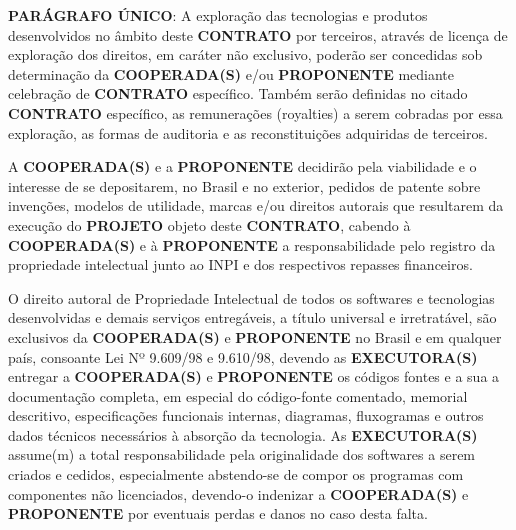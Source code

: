 \leftskip 30pt 
\textbf{PARÁGRAFO ÚNICO}: A exploração das tecnologias e produtos desenvolvidos no âmbito deste \textbf{CONTRATO} por terceiros, através de licença de exploração dos direitos, em caráter não exclusivo, poderão ser concedidas sob determinação da \textbf{COOPERADA(S)} e/ou \textbf{PROPONENTE} mediante celebração de \textbf{CONTRATO} específico. Também serão definidas no citado \textbf{CONTRATO} específico, as remunerações (royalties) a serem cobradas por essa exploração, as formas de auditoria e as reconstituições adquiridas de terceiros.

\xx A \textbf{COOPERADA(S)} e a \textbf{PROPONENTE} decidirão pela viabilidade e o interesse de se depositarem, no Brasil e no exterior, pedidos de patente sobre invenções, modelos de utilidade, marcas e/ou direitos autorais que resultarem da execução do \textbf{PROJETO} objeto deste \textbf{CONTRATO}, cabendo à \textbf{COOPERADA(S)} e à \textbf{PROPONENTE} a responsabilidade pelo registro da propriedade intelectual junto ao INPI e dos respectivos repasses financeiros.

\xx O direito autoral de Propriedade Intelectual de todos os softwares e tecnologias desenvolvidas e demais serviços entregáveis, a título universal e irretratável, são exclusivos da \textbf{COOPERADA(S)} e \textbf{PROPONENTE} no Brasil e em qualquer país, consoante Lei Nº 9.609/98 e 9.610/98, devendo as \textbf{EXECUTORA(S)} entregar a \textbf{COOPERADA(S)} e \textbf{PROPONENTE} os códigos fontes e a sua a documentação completa, em especial do código-fonte comentado, memorial descritivo, especificações funcionais internas, diagramas, fluxogramas e outros dados técnicos necessários à absorção da tecnologia. As \textbf{EXECUTORA(S)} assume(m) a total responsabilidade pela originalidade dos softwares a serem criados e cedidos, especialmente abstendo-se de compor os programas com componentes não licenciados, devendo-o indenizar a \textbf{COOPERADA(S)} e \textbf{PROPONENTE} por eventuais perdas e danos no caso desta falta.
